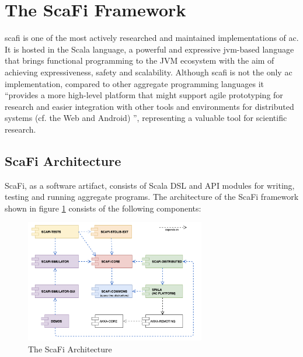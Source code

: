 \section{The ScaFi Framework}
\ac{scafi} is one of the most actively researched and maintained implementations of \ac{ac}.
It is hosted in the Scala language, a powerful and expressive \ac{jvm}-based language that brings functional programming to the JVM ecosystem with the aim of achieving expressiveness, safety and scalability.
Although \ac{scafi} is not the only \ac{ac} implementation, compared to other aggregate programming languages it ``provides a more high-level platform that
might support agile prototyping for research and easier integration with other tools and environments for distributed systems
(cf. the Web and Android) \cite{10.1145/3285956}'', representing a valuable tool for scientific research.

\subsection{ScaFi Architecture}
ScaFi, as a software artifact, consists of Scala DSL and API modules for writing, testing and running aggregate programs. The architecture of the ScaFi framework shown in figure \ref{fig:scafi-architecture} consists of the following components:

\begin{figure}[h]
    \centering
    \includegraphics[width=0.7\textwidth]{figures/scafi-architecture.png}
    \caption{The ScaFi Architecture}
    \label{fig:scafi-architecture}
\end{figure}

